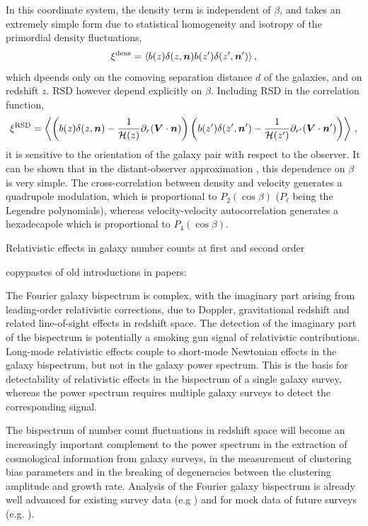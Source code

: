 In this coordinate system, the density term is independent of $\beta$, and takes an extremely simple form due to statistical homogeneity and isotropy of the primordial density fluctuations, 
\begin{equation}
	\xi^\mathrm{dens} = \langle b(z) \delta(z,\bm {n}) b(z') \delta(z', \bm {n}') \rangle\,,
\end{equation}
which dpeends only on the comoving separation distance $d$ of the galaxies, and on redshift $z$. 
RSD however depend explicitly on $\beta$. Including RSD in the correlation function, 
\begin{equation}
	\xi^\mathrm{RSD} = \left\langle \left( b(z) \delta(z,\bm {n}) - \frac{1}{\mathcal{H}(z)} \partial_r (\bm{V} \cdot \bm {n}) \right) \left( b(z') \delta(z', \bm {n}') - \frac{1}{\mathcal{H}(z')} \partial_{r'} (\bm{V} \cdot \bm {n}') \right) \right\rangle\,,
\end{equation}
it is sensitive to the orientation of the galaxy pair with respect to the observer. It can be shown that in the distant-observer approximation , this dependence on $\beta$ is very simple. The cross-correlation between density and velocity generates a quadrupole modulation, which is proportional to $P_2(\cos\beta)$ ($P_\ell$ being the Legendre polynomials), whereas velocity-velocity autocorrelation generates a hexadecapole which is proportional to $P_4(\cos\beta)$. 


\iffalse


Relativistic effects in galaxy number counts at first and second order

copypastes of old introductions in papers:

The Fourier galaxy bispectrum is complex, with the imaginary part arising from leading-order relativistic corrections, due to Doppler, gravitational redshift  and related line-of-sight effects  in redshift space. The detection of the imaginary  part of the bispectrum is potentially a smoking gun signal of relativistic contributions. Long-mode relativistic effects couple to  short-mode Newtonian effects in the galaxy bispectrum, but not in the galaxy power spectrum. This is  the basis for detectability of relativistic effects in the bispectrum of a single galaxy survey, whereas the power spectrum requires multiple galaxy surveys to detect the corresponding signal.

The bispectrum of number count fluctuations in redshift space will become an increasingly important complement to the power spectrum in the extraction of cosmological information from galaxy surveys, 
{in the measurement of {clustering} bias parameters and in the breaking of degeneracies between the clustering amplitude and growth rate.}
Analysis of the Fourier galaxy bispectrum is already well advanced for existing survey data (e.g \cite{Gil-Marin:2016wya,Sugiyama:2018yzo}) and for mock data of future surveys (e.g. \cite{Karagiannis:2018jdt,Yankelevich:2018uaz,Oddo:2019run,Sugiyama:2019ike}). 

